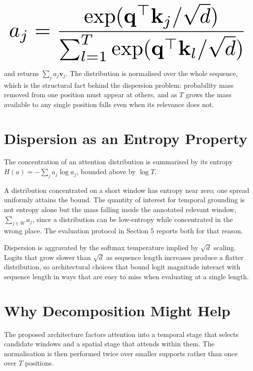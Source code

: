 \documentclass{article}
\begin{document}
\begin{equation}
\resizebox{\columnwidth}{!}{$\displaystyle
\begin{aligned}
a_j = \frac{\exp(\mathbf{q}^{\top}\mathbf{k}_j / \sqrt{d})}{\sum_{l=1}^{T} \exp(\mathbf{q}^{\top}\mathbf{k}_l / \sqrt{d})}
\end{aligned}
$}
\end{equation}










and returns $\sum_j a_j \mathbf{v}_j$. The distribution is normalised over the whole sequence, which is the structural fact behind the dispersion problem: probability mass removed from one position must appear at others, and as $T$ grows the mass available to any single position falls even when its relevance does not.


\section{Dispersion as an Entropy Property}


The concentration of an attention distribution is summarised by its entropy $H(a) = -\sum_j a_j \log a_j$, bounded above by $\log T$.

A distribution concentrated on a short window has entropy near zero; one spread uniformly attains the bound. The quantity of interest for temporal grounding is not entropy alone but the mass falling inside the annotated relevant window, $\sum_{j \in W} a_j$, since a distribution can be low-entropy while concentrated in the wrong place. The evaluation protocol in Section 5 reports both for that reason.

Dispersion is aggravated by the softmax temperature implied by $\sqrt{d}$ scaling. Logits that grow slower than $\sqrt{d}$ as sequence length increases produce a flatter distribution, so architectural choices that bound logit magnitude interact with sequence length in ways that are easy to miss when evaluating at a single length.


\section{Why Decomposition Might Help}


The proposed architecture factors attention into a temporal stage that selects candidate windows and a spatial stage that attends within them. The normalisation is then performed twice over smaller supports rather than once over $T$ positions.
\end{document}
